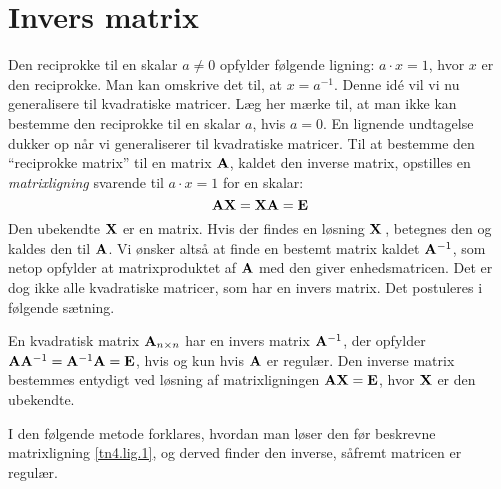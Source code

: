 \section{Invers matrix}
Den reciprokke til en skalar $ a \neq 0 $ opfylder følgende ligning: $ a \cdot x = 1 $, hvor $ x $ er den reciprokke. Man kan omskrive det til, at $ x = a^{-1} $. Denne idé vil vi nu generalisere til kvadratiske matricer. Læg her mærke til, at man ikke kan bestemme den reciprokke til en skalar $a$, hvis $ a=0 $. En lignende undtagelse dukker op når vi generaliserer til kvadratiske matricer.\bs
Til at bestemme den ``reciprokke matrix'' til en matrix $ \mathbf{A} $, kaldet den inverse matrix, opstilles en \textit{matrixligning} svarende til $ a \cdot x = 1 $ for en skalar:
\begin{equation}
\mathbf{A} \mathbf{X} = \mathbf{X} \mathbf{A} = \mathbf{E} \label{tn4.lig.1}
\end{equation}
Den ubekendte $ \mathbf{X} $ er en matrix. Hvis der findes en løsning $ \mathbf{X}\,$,  betegnes den  og kaldes den  til $ \mathbf{A} $. Vi ønsker altså at finde en bestemt matrix kaldet $ \mathbf{A}^{-1} $, som netop opfylder at matrixproduktet af $ \mathbf{A} $ med den giver enhedsmatricen. \bs
Det er dog ikke alle kvadratiske matricer, som har en invers matrix. 
 Det postuleres i følgende sætning.

\begin{theorem} \label{tn4.findesinvers}
En kvadratisk matrix $ \mathbf{A}_{n \times n} $ har en invers matrix $ \mathbf{A}^{-1} $, der opfylder $ \mathbf{A} \mathbf{A}^{-1} = \mathbf{A}^{-1} \mathbf{A} = \mathbf{E} $, hvis og kun hvis $ \mathbf{A} $ er regulær. \bs
Den inverse matrix bestemmes entydigt ved løsning af  matrixligningen $ \mathbf{A} \mathbf{X} = \mathbf{E} $, hvor $ \mathbf{X} $ er den ubekendte.
\end{theorem}



I den følgende metode forklares, hvordan man løser den før beskrevne matrixligning \eqref{tn4.lig.1}, og derved finder den inverse, såfremt matricen er regulær.

